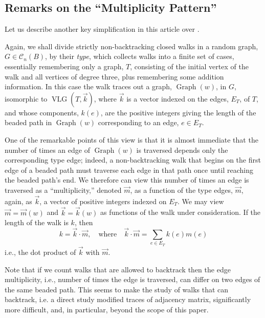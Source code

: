 \documentclass{memo-l}
\theoremstyle{plain}
\theoremstyle{definition}
\numberwithin{section}{chapter}
\numberwithin{equation}{chapter}
\DeclareMathOperator{\VLG}{VLG}
\DeclareMathOperator{\Graph}{Graph}
\theoremstyle{plain}
\theoremstyle{definition}
\newcommand\cC{\mathcal{C}}
\begin{document}
{\subsection{Remarks on the ``Multiplicity Pattern''}

Let us describe another key simplification in this article
over \cite{friedman_random_graphs,friedman_alon}.

Again, we shall divide strictly non-backtracking closed walks in a random
graph, $G\in\cC_n(B)$, by their {\em type}, which collects
walks into a finite set of cases,  essentially remembering only
a graph, $T$, consisting of
the initial vertex of the walk and all vertices of degree three,
plus remembering some addition information.  In this case the walk
traces out a graph, $\Graph(w)$, in $G$, isomorphic to
$\VLG(T,\vec k)$, where $\vec k$ is a vector indexed on the edges,
$E_T$, of $T$, and whose components, $k(e)$, are the positive integers
giving the length of the \gls{beaded path} in $\Graph(w)$ corresponding
to an edge, $e\in E_T$.

One of the remarkable points of this view is that it is almost
immediate that the number of times
an edge of $\Graph(w)$ is traversed depends only the corresponding type
edge; indeed, a non-backtracking walk that begins on the first edge
of a beaded path must traverse each edge in that path once until reaching
the beaded path's end.  We therefore can view this number of times an
edge is traversed as a ``multiplicity,'' denoted $\vec m$, as a function of
the type edges, $\vec m$, again, as $\vec k$, 
a vector of positive integers indexed on $E_T$.
We may view $\vec m=\vec m(w)$ and $\vec k=\vec k(w)$ as 
functions of the walk under
consideration.
If the length of the walk is $k$, then
$$
k = \vec k \cdot \vec m,\quad\mbox{where}\quad
\vec k\cdot\vec m = \sum_{e\in E_T} k(e)m(e)
$$
i.e., the dot product of $\vec k$ with $\vec m$.

Note that if we count walks that are allowed to backtrack then the
edge multiplicity, i.e., number of times the edge is traversed,
can differ on two edges of the same beaded path.  This seems to make
the study of walks that can backtrack, i.e. a direct study 
modified traces of adjacency matrix, significantly more difficult,
and, in particular, beyond the scope of this paper.

}
\end{document}
